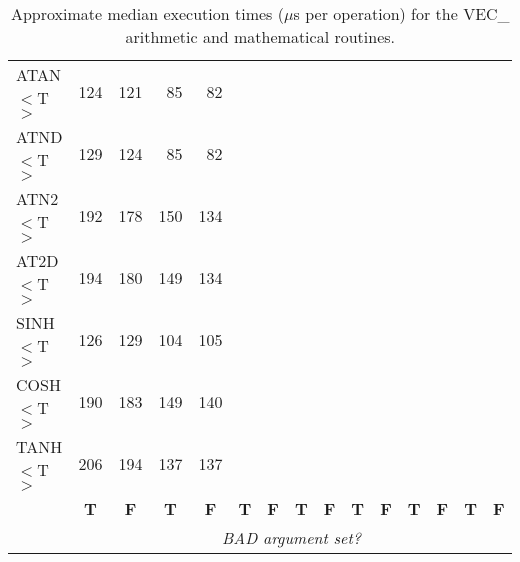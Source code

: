 \documentclass[11pt,nolof]{starlink}
\providecommand{\name}[1]{#1}
\begin{document}
\begin{table}[h]
\begin{center}
\begin{scriptsize}
\begin{tabular}{|l|r|r||r|r||r|r||r|r||r|r||r|r||r|r|}
ATAN$<$T$>$ &  124 &  121 &   85 &   82 &      &      &      &      &      &      &      &      &      &      \\
ATND$<$T$>$ &  129 &  124 &   85 &   82 &      &      &      &      &      &      &      &      &      &      \\
ATN2$<$T$>$ &  192 &  178 &  150 &  134 &      &      &      &      &      &      &      &      &      &      \\
AT2D$<$T$>$ &  194 &  180 &  149 &  134 &      &      &      &      &      &      &      &      &      &      \\
SINH$<$T$>$ &  126 &  129 &  104 &  105 &      &      &      &      &      &      &      &      &      &      \\
COSH$<$T$>$ &  190 &  183 &  149 &  140 &      &      &      &      &      &      &      &      &      &      \\
TANH$<$T$>$ &  206 &  194 &  137 &  137 &      &      &      &      &      &      &      &      &      &      \\
\hline
\multicolumn{1}{c}{} &
\multicolumn{1}{|c}{\textbf{T}} & \multicolumn{1}{|c||}{\textbf{F}} &
\multicolumn{1}{c}{\textbf{T}} & \multicolumn{1}{|c||}{\textbf{F}} &
\multicolumn{1}{c}{\textbf{T}} & \multicolumn{1}{|c||}{\textbf{F}} &
\multicolumn{1}{c}{\textbf{T}} & \multicolumn{1}{|c||}{\textbf{F}} &
\multicolumn{1}{c}{\textbf{T}} & \multicolumn{1}{|c||}{\textbf{F}} &
\multicolumn{1}{c}{\textbf{T}} & \multicolumn{1}{|c||}{\textbf{F}} &
\multicolumn{1}{c}{\textbf{T}} & \multicolumn{1}{|c|}{\textbf{F}}\\
\cline{2-15}
\multicolumn{1}{c}{} &
\multicolumn{14}{|c|}{\emph{BAD argument set?}}\\
\cline{2-15}
\end{tabular}
\end{scriptsize}
\caption{Approximate median execution times ($\mu$s per operation) for the
\name{VEC\_} arithmetic and mathematical routines.}
\label{table:vecstats}
\end{center}
\end{table}

\newpage
\end{document}
